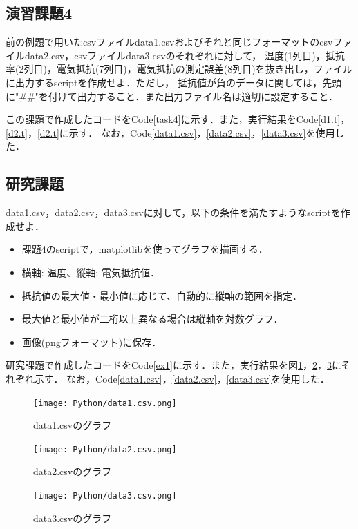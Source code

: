 \documentclass[a4paper,11pt]{jsarticle}
\begin{document}
\subsection{演習課題4}
  \begin{screen}
    前の例題で用いたcsvファイルdata1.csvおよびそれと同じフォーマットのcsvファイルdata2.csv，csvファイルdata3.csvのそれぞれに対して，
    温度(1列目)，抵抗率(2列目)，電気抵抗(7列目)，電気抵抗の測定誤差(8列目)を抜き出し，ファイルに出力するscriptを作成せよ．ただし，
    抵抗値が負のデータに関しては，先頭に"\#\#"を付けて出力すること．また出力ファイル名は適切に設定すること．
  \end{screen}
  この課題で作成したコードをCode\ref{task4}に示す．また，実行結果をCode\ref{d1.t}，\ref{d2.t}，\ref{d2.t}に示す．
  なお，Code\ref{data1.csv}，\ref{data2.csv}，\ref{data3.csv}を使用した．
  
  
  
  

\subsection{研究課題}
  \begin{screen}
    data1.csv，data2.csv，data3.csvに対して，以下の条件を満たすようなscriptを作成せよ．
    \begin{itemize}
      \item 課題4のscriptで，matplotlibを使ってグラフを描画する．
      \item 横軸: 温度、縦軸: 電気抵抗値．
      \item 抵抗値の最大値・最小値に応じて、自動的に縦軸の範囲を指定．
      \item 最大値と最小値が二桁以上異なる場合は縦軸を対数グラフ．
      \item 画像(pngフォーマット)に保存．
    \end{itemize}
  \end{screen}
  研究課題で作成したコードをCode\ref{ex1}に示す．また，実行結果を図\ref{ex1p}，\ref{ex2p}，\ref{ex3p}にそれぞれ示す．
  なお，Code\ref{data1.csv}，\ref{data2.csv}，\ref{data3.csv}を使用した．
  
  \begin{figure}[H]
    \centering
    \texttt{[image: Python/data1.csv.png]}
    \caption{data1.csvのグラフ}
    \label{ex1p}
  \end{figure}
  \begin{figure}[H]
    \centering
    \texttt{[image: Python/data2.csv.png]}
    \caption{data2.csvのグラフ}
    \label{ex2p}
  \end{figure}
  \begin{figure}[H]
    \centering
    \texttt{[image: Python/data3.csv.png]}
    \caption{data3.csvのグラフ}
    \label{ex3p}
  \end{figure}
\end{document}
